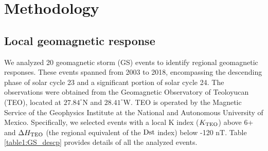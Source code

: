 \documentclass[a4paper,fleqn]{cas-dc}
\begin{document}




\section{Methodology}
\label{Methodology}

\subsection{Local geomagnetic response}
\label{local response}
We analyzed 20 geomagnetic storm (GS) events to identify regional geomagnetic responses. These events spanned from 2003 to 2018, encompassing the descending phase of solar cycle 23 and a significant portion of solar cycle 24. The observations were obtained from the Geomagnetic Observatory of Teoloyucan (TEO), located at $27.84^\circ$N and $28.41^\circ$W. TEO is operated by the Magnetic Service of the Geophysics Institute at the National and Autonomous University of Mexico. Specifically, we selected events with a local K index ($K_{\rm TEO}$) above 6+ and $\Delta {H_{\rm TEO}}$ (the regional equivalent of the ${\rm Dst}$ index) below -120 nT. Table \ref{table1:GS_descp} provides details of all the analyzed events.

\end{document}
